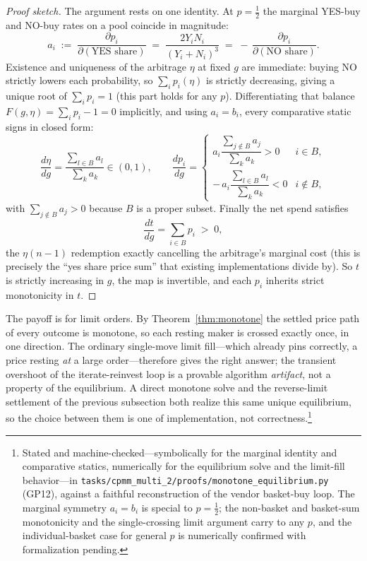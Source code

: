 \documentclass[11pt]{article}
\begin{document}
\begin{proof}[Proof sketch]
The argument rests on one identity. At $p = \tfrac12$ the marginal YES-buy and NO-buy rates on a pool coincide in magnitude:
\begin{equation}
a_i \;:=\; \frac{\partial p_i}{\partial(\text{YES share})} \;=\; \frac{2 Y_i N_i}{(Y_i + N_i)^3} \;=\; -\,\frac{\partial p_i}{\partial(\text{NO share})}.
\end{equation}
Existence and uniqueness of the arbitrage $\eta$ at fixed $g$ are immediate: buying NO strictly lowers each probability, so $\sum_i p_i(\eta)$ is strictly decreasing, giving a unique root of $\sum_i p_i = 1$ (this part holds for any $p$). Differentiating that balance $F(g,\eta) = \sum_i p_i - 1 = 0$ implicitly, and using $a_i = b_i$, every comparative static signs in closed form:
\begin{equation}
\frac{d\eta}{dg} = \frac{\sum_{l \in B} a_l}{\sum_{k} a_k} \in (0,1), \qquad
\frac{dp_i}{dg} = \begin{cases} a_i \dfrac{\sum_{j \notin B} a_j}{\sum_k a_k} > 0 & i \in B,\\[2ex] -\,a_i \dfrac{\sum_{l \in B} a_l}{\sum_k a_k} < 0 & i \notin B,\end{cases}
\end{equation}
with $\sum_{j\notin B} a_j > 0$ because $B$ is a proper subset. Finally the net spend satisfies
\begin{equation}
\frac{dt}{dg} = \sum_{i \in B} p_i \;>\; 0,
\end{equation}
the $\eta(n-1)$ redemption exactly cancelling the arbitrage's marginal cost (this is precisely the ``yes share price sum'' that existing implementations divide by). So $t$ is strictly increasing in $g$, the map is invertible, and each $p_i$ inherits strict monotonicity in $t$.
\end{proof}

The payoff is for limit orders. By Theorem~\ref{thm:monotone} the settled price path of every outcome is monotone, so each resting maker is crossed exactly once, in one direction. The ordinary single-move limit fill---which already pins correctly, a price resting \emph{at} a large order---therefore gives the right answer; the transient overshoot of the iterate-reinvest loop is a provable algorithm \emph{artifact}, not a property of the equilibrium. A direct monotone solve and the reverse-limit settlement of the previous subsection both realize this same unique equilibrium, so the choice between them is one of implementation, not correctness.\footnote{Stated and machine-checked---symbolically for the marginal identity and comparative statics, numerically for the equilibrium solve and the limit-fill behavior---in \texttt{tasks/cpmm\_multi\_2/proofs/monotone\_equilibrium.py} (GP12), against a faithful reconstruction of the vendor basket-buy loop. The marginal symmetry $a_i = b_i$ is special to $p = \tfrac12$; the non-basket and basket-sum monotonicity and the single-crossing limit argument carry to any $p$, and the individual-basket case for general $p$ is numerically confirmed with formalization pending.}
\end{document}

